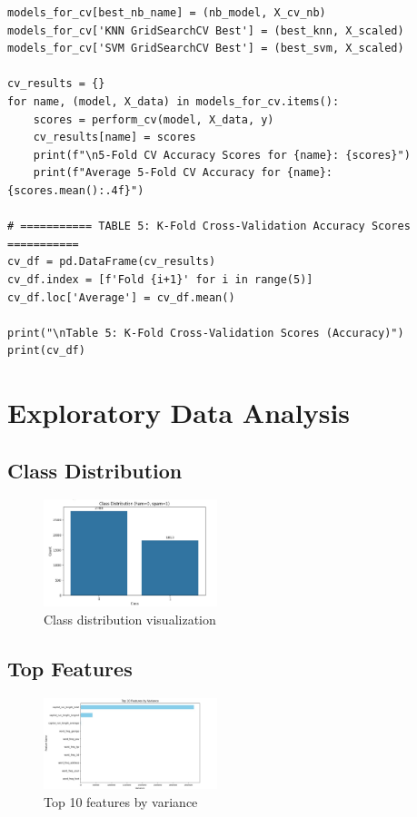 \documentclass[12pt]{article}
\begin{document}
\begin{verbatim}
models_for_cv[best_nb_name] = (nb_model, X_cv_nb)
models_for_cv['KNN GridSearchCV Best'] = (best_knn, X_scaled)
models_for_cv['SVM GridSearchCV Best'] = (best_svm, X_scaled)

cv_results = {}
for name, (model, X_data) in models_for_cv.items():
    scores = perform_cv(model, X_data, y)
    cv_results[name] = scores
    print(f"\n5-Fold CV Accuracy Scores for {name}: {scores}")
    print(f"Average 5-Fold CV Accuracy for {name}: {scores.mean():.4f}")

# =========== TABLE 5: K-Fold Cross-Validation Accuracy Scores ===========
cv_df = pd.DataFrame(cv_results)
cv_df.index = [f'Fold {i+1}' for i in range(5)]
cv_df.loc['Average'] = cv_df.mean()

print("\nTable 5: K-Fold Cross-Validation Scores (Accuracy)")
print(cv_df)
\end{verbatim}

\section*{Exploratory Data Analysis}

\subsection*{Class Distribution}
\begin{figure}[H]
\centering
\includegraphics[width=0.45\textwidth]{class.jpeg}
\caption{Class distribution visualization}
\end{figure}

\subsection*{Top Features}
\begin{figure}[H]
\centering
\includegraphics[width=0.45\textwidth]{top.jpeg}
\caption{Top 10 features by variance}
\end{figure}
\end{document}

